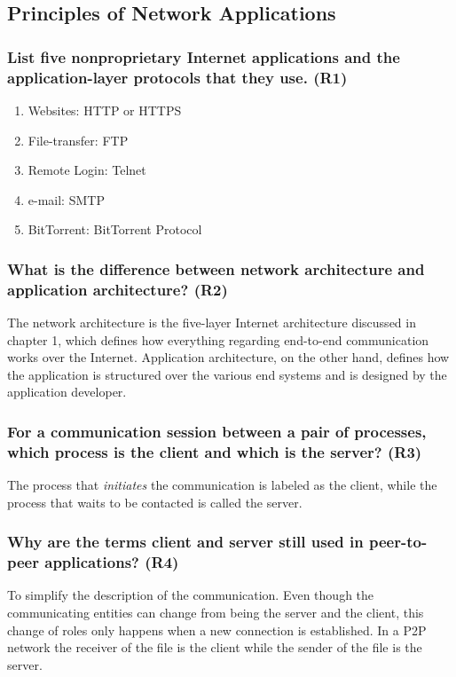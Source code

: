 \subsection{Principles of Network Applications}


\subsubsection{List five nonproprietary Internet applications and the application-layer protocols
that they use. (R1)}
\begin{enumerate}
    \item Websites: HTTP or HTTPS
    \item File-transfer: FTP
    \item Remote Login: Telnet
    \item e-mail: SMTP
    \item BitTorrent: BitTorrent Protocol
\end{enumerate}


\subsubsection{What is the difference between network architecture and application architecture? (R2)}
The network architecture is the five-layer Internet architecture discussed in chapter 1, which defines how everything regarding end-to-end communication works over the Internet. Application architecture, on the other hand, defines how the application is structured over the various end systems and is designed by the application developer.


\subsubsection{For a communication session between a pair of processes, which process is the client and which is the server? (R3)}
The process that \textit{initiates} the communication is labeled as the client, while the process that waits to be contacted is called the server.


\subsubsection{Why are the terms client and server still used in peer-to-peer applications? (R4)}
To simplify the description of the communication. Even though the communicating entities can change from being the server and the client, this change of roles only happens when a new connection is established. In a P2P network the receiver of the file is the client while the sender of the file is the server. 


